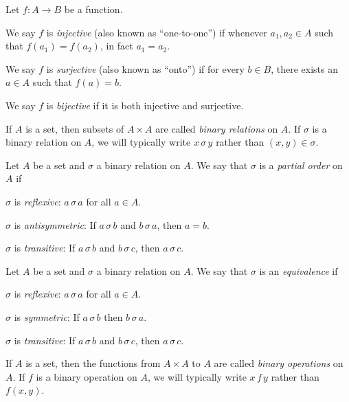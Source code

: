 \begin{proplist}
\item Let \(f : A \rightarrow B\) be a function.
\begin{proplist}
\item We say \(f\) is \emph{injective} (also known as ``one-to-one'') if whenever \(a_1, a_2 \in A\) such that \(f(a_1) = f(a_2)\), in fact \(a_1 = a_2\).
\item We say \(f\) is \emph{surjective} (also known as ``onto'') if for every \(b \in B\), there exists an \(a \in A\) such that \(f(a) = b\).
\item We say \(f\) is \emph{bijective} if it is both injective and surjective.
\end{proplist}

\item If \(A\) is a set, then subsets of \(A \times A\) are called \emph{binary relations} on \(A\). If \(\sigma\) is a binary relation on \(A\), we will typically write \(x \,\sigma\, y\) rather than \((x,y) \in \sigma\).

\item Let \(A\) be a set and \(\sigma\) a binary relation on \(A\). We say that \(\sigma\) is a \emph{partial order} on \(A\) if
\begin{proplist}
\item \(\sigma\) is \emph{reflexive}: \(a \,\sigma\, a\) for all \(a \in A\).
\item \(\sigma\) is \emph{antisymmetric}: If \(a \,\sigma\, b\) and \(b \,\sigma\, a\), then \(a = b\).
\item \(\sigma\) is \emph{transitive}: If \(a \,\sigma\, b\) and \(b \,\sigma\, c\), then \(a \,\sigma\, c\).
\end{proplist}

\item Let \(A\) be a set and \(\sigma\) a binary relation on \(A\). We say that \(\sigma\) is an \emph{equivalence} if
\begin{proplist}
\item \(\sigma\) is \emph{reflexive}: \(a \,\sigma\, a\) for all \(a \in A\).
\item \(\sigma\) is \emph{symmetric}: If \(a \,\sigma\, b\) then \(b \,\sigma\, a\).
\item \(\sigma\) is \emph{transitive}: If \(a \,\sigma\, b\) and \(b \,\sigma\, c\), then \(a \,\sigma\, c\).
\end{proplist}

\item If \(A\) is a set, then the functions from \(A \times A\) to \(A\) are called \emph{binary operations} on \(A\). If \(f\) is a binary operation on \(A\), we will typically write \(x \,f\, y\) rather than \(f(x,y)\).
\end{proplist}
